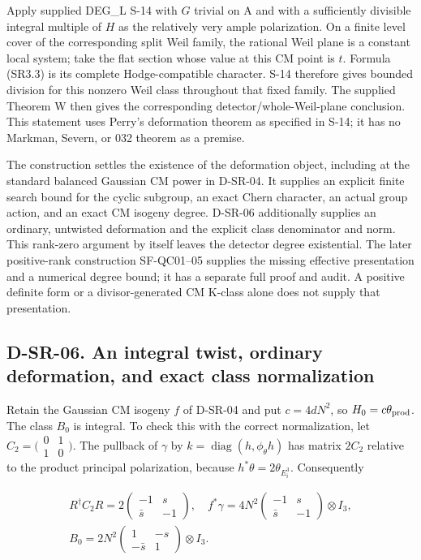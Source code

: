 Apply supplied DEG\_L S-14 with \(G\) trivial on A and with a sufficiently divisible integral multiple of \(H\) as the relatively very ample polarization. On a finite level cover of the corresponding split Weil family, the rational Weil plane is a constant local system; take the flat section whose value at this CM point is \(t\). Formula (SR3.3) is its complete Hodge-compatible character. S-14 therefore gives bounded division for this nonzero Weil class throughout that fixed family. The supplied Theorem W then gives the corresponding detector/whole-Weil-plane conclusion. This statement uses Perry's deformation theorem as specified in S-14; it has no Markman, Severn, or 032 theorem as a premise. \cite{SR-Perry2026}

The construction settles the existence of the deformation object, including at the standard balanced Gaussian CM power in D-SR-04. It supplies an explicit finite search bound for the cyclic subgroup, an exact Chern character, an actual group action, and an exact CM isogeny degree. D-SR-06 additionally supplies an ordinary, untwisted deformation and the explicit class denominator and norm. This rank-zero argument by itself leaves the detector degree existential. The later positive-rank construction SF-QC01--05 supplies the missing effective presentation and a numerical degree bound; it has a separate full proof and audit. A positive definite form or a divisor-generated CM K-class alone does not supply that presentation.

\subsection{D-SR-06. An integral twist, ordinary deformation, and exact class normalization}
\label{D-SR-06}

Retain the Gaussian CM isogeny \(f\) of D-SR-04 and put \(c=4dN^2\), so \(H_0=c\theta_{\rm prod}\). The class \(B_0\) is integral. To check this with the correct normalization, let \(C_2=\bigl(\begin{smallmatrix}0&1\\1&0\end{smallmatrix}\bigr)\). The pullback of \(\gamma\) by \(k=\operatorname{diag}(h,\phi_\theta h)\) has matrix \(2C_2\) relative to the product principal polarization, because \(h^*\theta=2\theta_{E_i^3}\). Consequently

\[
\begin{gathered}R^\dagger C_2R=2\begin{pmatrix}-1&s\\\bar s&-1\end{pmatrix},\quad f^*\gamma=4N^2\begin{pmatrix}-1&s\\\bar s&-1\end{pmatrix}\otimes I_3,\\B_0=2N^2\begin{pmatrix}1&-s\\-\bar s&1\end{pmatrix}\otimes I_3.\end{gathered}\tag{SR6.1}
\]

